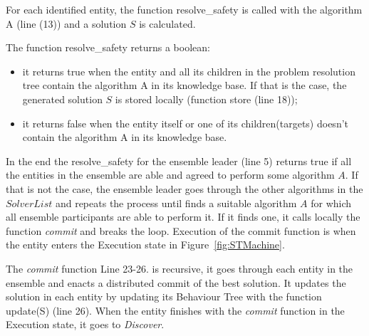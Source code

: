 \documentclass[journal]{IEEEtran}
\theoremstyle{definition}
\begin{document}
For each identified entity, the function resolve\_safety is called with the algorithm A (line (13)) 
and a solution $S$ is calculated. 

The function resolve\_safety returns a boolean: 
\begin{itemize}
\item it returns true when the entity and all its children in the problem resolution tree contain the algorithm A in its knowledge base.  If that is the case, the generated solution $S$ is stored locally (function store (line 18));
\item it returns false when the entity itself or one of its children(targets) doesn't contain the algorithm A in its knowledge base.
\end{itemize}

In the end the resolve\_safety for the ensemble leader (line 5) returns true if all the entities in the ensemble are able and agreed to perform some algorithm $A$. If that is not the case, the ensemble leader goes through the other algorithms in the $SolverList$ and repeats the process until finds a suitable algorithm $A$ for which all ensemble participants are able to perform it. If it finds one, it calls locally the function \textit{commit} and breaks the loop. Execution of the commit function is when the entity enters the Execution state in Figure~\ref{fig:STMachine}.

The \textit{commit} function 
{Line 23-26.} is recursive, it goes through each entity in the ensemble and enacts a distributed commit of the best solution. It updates the solution in each entity by updating its Behaviour Tree with the function update(S) (line 26).
When the entity finishes with the \textit{commit} function in the Execution state, it goes to \textit{Discover}.


\end{document}
